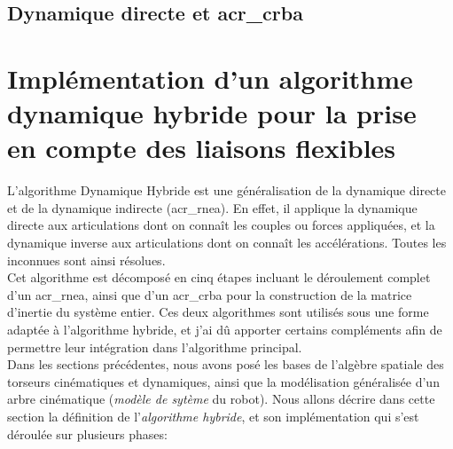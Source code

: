 \documentclass{report}
\begin{document}
\section{Dynamique directe et \gls{acr_crba}}



\chapter{Implémentation d'un algorithme dynamique hybride pour la prise en compte des liaisons flexibles}

L'algorithme Dynamique Hybride est une généralisation de la dynamique directe et de la dynamique indirecte (\gls{acr_rnea}). En effet, il applique la dynamique directe aux articulations dont on connaît les couples ou forces appliquées, et la dynamique inverse aux articulations dont on connaît les accélérations. Toutes les inconnues sont ainsi résolues.\\
Cet algorithme est décomposé en cinq étapes incluant le déroulement complet d'un \gls{acr_rnea}, ainsi que d'un \gls{acr_crba} pour la construction de la matrice d'inertie du système entier. Ces deux algorithmes sont utilisés sous une forme adaptée à l'algorithme hybride, et j'ai dû apporter certains compléments afin de permettre leur intégration dans l'algorithme principal.\\
Dans les sections précédentes, nous avons posé les bases de l'algèbre spatiale des torseurs cinématiques et dynamiques, ainsi que la modélisation généralisée d'un arbre cinématique (\emph{modèle de sytème} du robot). Nous allons décrire dans cette section la définition de l'\emph{algorithme hybride}, et son implémentation qui s'est déroulée sur plusieurs phases:\\
\end{document}

